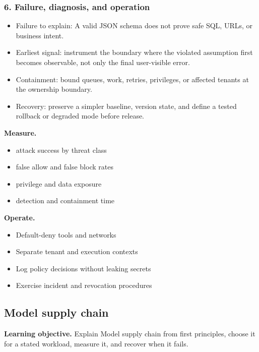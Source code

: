 \subsubsection*{6. Failure, diagnosis, and operation}
\begin{itemize}
\item Failure to explain: A valid JSON schema does not prove safe SQL, URLs, or business intent.
\item Earliest signal: instrument the boundary where the violated assumption first becomes observable, not only the final user-visible error.
\item Containment: bound queues, work, retries, privileges, or affected tenants at the ownership boundary.
\item Recovery: preserve a simpler baseline, version state, and define a tested rollback or degraded mode before release.
\end{itemize}
\textbf{Measure.}\begin{itemize}
\item attack success by threat class
\item false allow and false block rates
\item privilege and data exposure
\item detection and containment time
\end{itemize}
\textbf{Operate.}\begin{itemize}
\item Default-deny tools and networks
\item Separate tenant and execution contexts
\item Log policy decisions without leaking secrets
\item Exercise incident and revocation procedures
\end{itemize}
\subsection{Model supply chain}
\textbf{Learning objective.} Explain Model supply chain from first principles, choose it for a stated workload, measure it, and recover when it fails.

